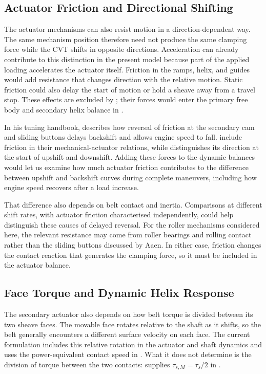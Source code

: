 \documentclass[11pt]{report}
\numberwithin{equation}{section}
\newcounter{assump}
\begin{document}
\subsection*{Actuator Friction and Directional Shifting}
\label{sec:future_work_mechanism_friction}

The actuator mechanisms can also resist motion in a direction-dependent way.
The same mechanism position therefore need not produce the same clamping force
while the CVT shifts in opposite directions. Acceleration can already
contribute to this distinction in the present model because part of the applied
loading accelerates the actuator itself. Friction in the ramps, helix, and guides
would add resistance that changes direction with the relative motion. Static
friction could also delay the start of motion or hold a sheave away from a
travel stop. These effects are excluded by
; their forces would enter the primary
free body and secondary helix balance in
.

In his tuning handbook, \citet{Aaen2007} describes how reversal of friction at
the secondary cam and sliding buttons delays backshift and allows engine speed
to fall. \citet{KimEtAl2002} include friction in their mechanical-actuator
relations, while \citet{Cammalleri2005} distinguishes its direction at the
start of upshift and downshift. Adding these forces to the dynamic balances
would let us examine how much actuator friction contributes to the difference
between upshift and backshift curves during complete maneuvers, including how
engine speed recovers after a load increase.

That difference also depends on belt contact and inertia. Comparisons at
different shift rates, with actuator friction characterised independently,
could help distinguish these causes of delayed reversal. For the roller
mechanisms considered here, the relevant resistance may come from roller
bearings and rolling contact rather than the sliding buttons discussed by
Aaen. In either case, friction changes the contact reaction that generates the
clamping force, so it must be included in the actuator balance.

\subsection*{Face Torque and Dynamic Helix Response}
\label{sec:future_work_face_torque}

The secondary actuator also depends on how belt torque is divided between its
two sheave faces. The movable face rotates relative to the shaft as it shifts,
so the belt generally encounters a different surface velocity on each face.
The current formulation includes this relative rotation in the actuator and
shaft dynamics and uses the power-equivalent contact speed in
. What it does not determine is
the division of torque between the two contacts:
 supplies \(\tau_{s,M}=\tau_s/2\) in
.
\end{document}
